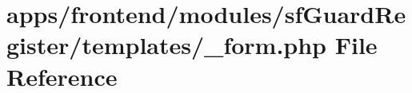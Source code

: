 \hypertarget{frontend_2modules_2sf_guard_register_2templates_2__form_8php}{\section{apps/frontend/modules/sf\-Guard\-Register/templates/\-\_\-form.php File Reference}
\label{frontend_2modules_2sf_guard_register_2templates_2__form_8php}
}
